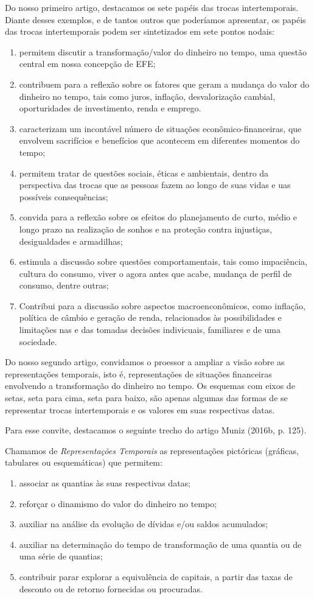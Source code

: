 \begin{paginatexto}
Do nosso primeiro artigo, destacamos os sete papéis das trocas intertemporais. Diante desses exemplos, e de tantos outros que poderíamos apresentar, os papéis das trocas intertemporais podem ser sintetizados em sete pontos nodais:
\begin{enumerate}
  \item permitem discutir a transformação/valor do dinheiro no tempo, uma questão central em nossa concepção de EFE;
  \item contribuem para a reflexão sobre os fatores que geram a mudança do valor do dinheiro no tempo, tais como juros, inflação, desvalorização cambial, oporturidades de investimento, renda e emprego.
  \item caracterizam um incontável número de situações econômico-financeiras, que envolvem sacrifícios e benefícios que acontecem em diferentes momentos do tempo;
  \item permitem tratar de questões sociais, éticas e ambientais, dentro da perspectiva das trocas que as pessoas fazem ao longo de suas vidas e uas possíveis consequências;
  \item convida para a reflexão sobre os efeitos do planejamento de curto, médio e longo prazo na realização de sonhos e na proteção contra injustiças, desigualdades e armadilhas;
  \item estimula a discussão sobre questões comportamentais, tais como impaciência, cultura do consumo, viver o agora antes que acabe, mudança de perfil de consumo, dentre outras;
  \item Contribui para a discussão sobre aspectos macroenconômicos, como inflação, política de câmbio e geração de renda, relacionados às possibilidades e limitações nas e das tomadas decisões indivicuais, familiares e de uma sociedade.
\end{enumerate}
  Do nosso segundo artigo, convidamos o proessor a ampliar a visão sobre as representações temporais, isto é, representações de situações financeiras envolvendo a transformação do dinheiro no tempo. Os esquemas com eixos de setas, seta para cima, seta para baixo, são apenas algumas das formas de se representar trocas intertemporais e os valores em suas respectivas datas.

  Para esse convite, destacamos o seguinte trecho do artigo Muniz (2016b, p. 125).

  Chamamos de \textit{Representações Temporais} as representações pictóricas (gráficas, tabulares ou esquemáticas) que permitem:
  \begin{enumerate}
    \item associar as quantias às suas respectivas datas;
    \item reforçar o dinamismo do valor do dinheiro no tempo;
    \item auxiliar na análise da evolução de dívidas e/ou saldos acumulados;
    \item auxiliar na determinação do tempo de transformação de uma quantia ou de uma série de quantias;
    \item contribuir parar explorar a equivalência de capitais, a partir das taxas de desconto ou de retorno fornecidas ou procuradas.
  \end{enumerate}


\end{paginatexto}
